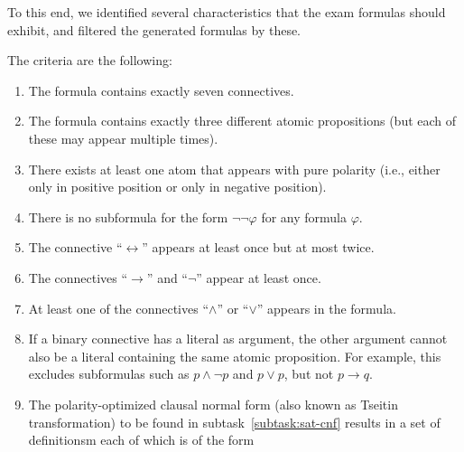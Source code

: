 To this end,
we identified several characteristics that the exam formulas should exhibit,
and filtered the generated formulas by these.

The criteria are the following:
\begin{enumerate}
    \item
        The formula contains exactly seven connectives.
    \item
        The formula contains exactly three different atomic propositions
        (but each of these may appear multiple times).
    \item\label{item:polarity}
        There exists at least one atom that appears with pure polarity
        (i.e., either only in positive position or only in negative position).
    \item
        There is no subformula for the form $\lnot \lnot \varphi$ for any formula $\varphi$.
    \item
        The connective ``$\leftrightarrow$'' appears at least once but at most twice.
    \item
        The connectives ``$\rightarrow$'' and ``$\lnot$'' appear at least once.
    \item
        At least one of the connectives ``$\land$'' or ``$\lor$'' appears in the formula.
    \item
        If a binary connective has a literal as argument,
        the other argument cannot also be a literal containing the same atomic proposition.
        For example, this excludes subformulas such as $p \land \lnot p$ and $p \lor p$,
        but not $p \rightarrow q$.
    \item
        The polarity-optimized clausal normal form
        (also known as Tseitin transformation)
        to be found in subtask~\ref{subtask:sat-cnf} results in a set of definitionsm
        each of which is of the form

\end{enumerate}
